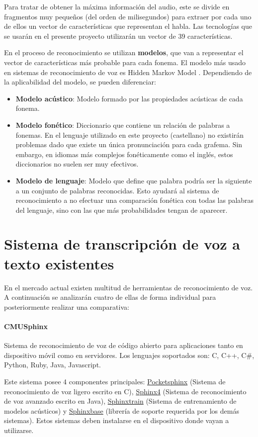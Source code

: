 \documentclass[../main.tex]{subfiles}
\begin{document}
Para tratar de obtener la máxima información del audio, este se divide en fragmentos muy pequeños (del orden de milisegundos) para extraer por cada uno de ellos un vector de características que representan el habla. Las tecnologías que se usarán en el presente proyecto utilizarán un vector de 39 características.

En el proceso de reconocimiento se utilizan \textbf{modelos}, que van a representar el vector de características más probable para cada fonema. El modelo más usado en sistemas de reconocimiento de voz es Hidden Markov Model \cite{}. Dependiendo de la aplicabilidad del modelo, se pueden diferenciar:
\begin{itemize}
    \item \textbf{Modelo acústico}: Modelo formado por las propiedades acústicas de cada fonema.
    \item \textbf{Modelo fonético}: Diccionario que contiene un relación de palabras a fonemas. En el lenguaje utilizado en este proyecto (castellano) no existirán problemas dado que existe un única pronunciación para cada grafema. Sin embargo, en idiomas más complejos fonéticamente como el inglés, estos diccionarios no suelen ser muy efectivos.
    \item \textbf{Modelo de lenguaje}: Modelo que define que palabra podría ser la siguiente a un conjunto de palabras reconocidas. Esto ayudará al sistema de reconocimiento a no efectuar una comparación fonética con todas las palabras del lenguaje, sino con las que más probabilidades tengan de aparecer.
\end{itemize}

\section{Sistema de transcripción de voz a texto existentes}\label{sec:sistemas_voz}
En el mercado actual existen multitud de herramientas de reconocimiento de voz. A continuación se analizarán cuatro de ellas de forma individual para posteriormente realizar una comparativa: 

\paragraph{CMUSphinx}\label{par:cmusphinx}
Sistema de reconocimiento de voz de código abierto para aplicaciones tanto en dispositivo móvil como en servidores. Los lenguajes soportados son: C, C++, C\#, Python, Ruby, Java, Javascript.\cite{}

Este sistema posee 4 componentes principales: \underline{Pocketsphinx} (Sistema de reconocimiento de voz ligero escrito en C), \underline{Sphinx4} (Sistema de reconocimiento de voz avanzado escrito en Java), \underline{Sphinxtrain} (Sistema de entrenamiento de modelos acústicos) y \underline{Sphinxbase} (librería de soporte requerida por los demás sistemas). Estos sistemas deben instalarse en el dispositivo donde vayan a utilizarse.
\end{document}
